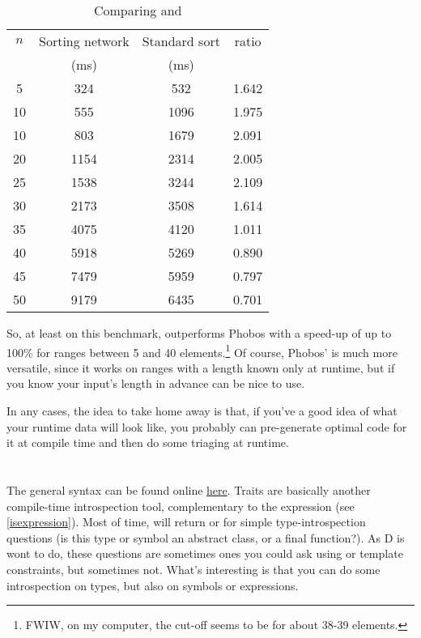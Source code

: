 \begin{table}[htb]
\centering
\begin{tabular}[c]{|c|c|c|c|}
\hline
$n$ & Sorting network & Standard sort & ratio \\
    & (ms)            & (ms)          &       \\ \hline \hline
5  & 324  & 532  & 1.642 \\ \hline
10 & 555  & 1096 & 1.975 \\ \hline
10 & 803  & 1679 & 2.091 \\ \hline
20 & 1154 & 2314 & 2.005 \\ \hline
25 & 1538 & 3244 & 2.109 \\ \hline
30 & 2173 & 3508 & 1.614 \\ \hline
35 & 4075 & 4120 & 1.011 \\ \hline
40 & 5918 & 5269 & 0.890 \\ \hline
45 & 7479 & 5959 & 0.797 \\ \hline
50 & 9179 & 6435 & 0.701 \\ \hline
\end{tabular}
\caption{Comparing  and }
\label{table:sortingnetworkperformance}
\end{table}

So, at least on this benchmark,  outperforms Phobos with a speed-up of up to 100\% for ranges between 5 and 40 elements.\footnote{ FWIW, on my computer, the cut-off seems to be for about 38-39 elements.} Of course, Phobos'  is much more versatile, since it works on ranges with a length known only at runtime, but if you know your input's length in advance  can be nice to use.

In any cases, the idea to take home away is that, if you've a good idea of what your runtime data will look like, you probably can pre-generate optimal code for it at compile time and then do some triaging at runtime.

\section{\texorpdfstring{}
                        {\_\_traits}}
\label{traits}

The general  syntax can be found online \href{www.dlang.org/traits.html}{here}. Traits are basically another compile-time introspection tool, complementary to the  expression (see  \autoref{isexpression}). Most of time,  will return  or  for simple type-introspection questions (is this type or symbol an abstract class, or a final function?). As D is wont to do, these questions are sometimes ones you could ask using  or template constraints, but sometimes not. What's interesting is that you can do some introspection on types, but also on symbols or expressions.


